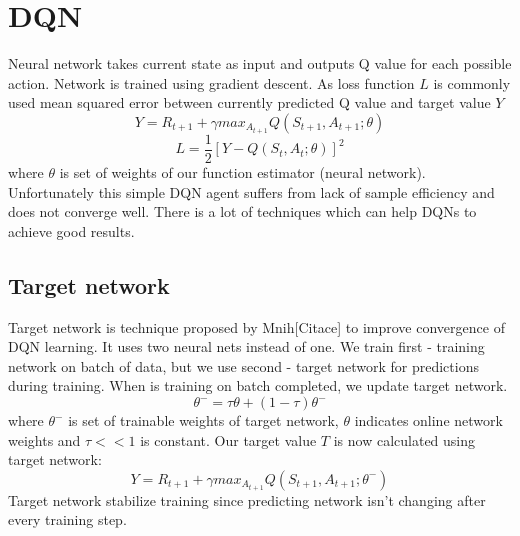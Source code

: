 \section{DQN}
Neural network takes current state as input and outputs Q value for each possible action. Network is trained using gradient descent. As loss function $L$ is commonly used mean squared error between currently predicted Q value and target value $Y$
\begin{equation}
Y = R_{t+1} + \gamma max_{A_{t+1}}Q(S_{t+1}, A_{t+1};\theta)
\end{equation}
\begin{equation}
L = \frac{1}{2}[Y - Q(S_t, A_t;\theta)]^2
\end{equation}
where $\theta$ is set of weights of our function estimator (neural network). Unfortunately this simple DQN agent suffers from lack of sample efficiency and does not converge well. There is a lot of techniques which can help DQNs to achieve good results.

\subsection{Target network}
Target network is technique proposed by Mnih[Citace] to improve convergence of DQN learning. It uses two neural nets instead of one. We train first - training network on batch of data, but we use second - target network for predictions during training. When is training on batch completed, we update target network.
\begin{equation}
\theta^- = \tau \theta + (1-\tau)\theta^-
\end{equation}
where $\theta^-$ is set of trainable weights of target network, $\theta$ indicates online network weights and $\tau << 1$ is constant.
Our target value $T$ is now calculated using target network:
\begin{equation}
Y = R_{t+1} + \gamma max_{A_{t+1}}Q(S_{t+1}, A_{t+1};\theta^-)
\end{equation}
Target network stabilize training since predicting network isn't changing after every training step.

